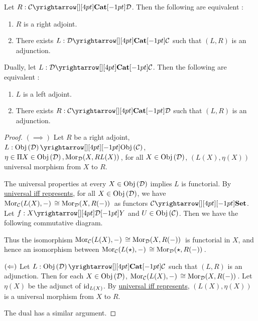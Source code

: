 \begin{prop}

  Let $R : \map{\CC}{\DD}{\CAT}{}$.
  Then the following are equivalent : 
  \begin{enumerate}
    \item $R$ is a right adjoint. 
    \item There exists $L : \map{\DD}{\CC}{\CAT}{}$ such that 
    $(L,R)$ is an adjunction. 
  \end{enumerate}

  Dually, let $L : \map{\DD}{\CC}{\CAT}{}$.
  Then the following are equivalent : 
  \begin{enumerate}
    \item $L$ is a left adjoint. 
    \item There exists $R : \map{\CC}{\DD}{\CAT}{}$ such that 
    $(L,R)$ is an adjunction. 
  \end{enumerate}
\end{prop}
\begin{proof}
  $(\implies)$
  Let $R$ be a right adjoint, $L : \map{\obj{\DD}}{\obj{\CC}}{}{}$, 
  $\eta \in \Pi X \in \mathrm{Obj}\left(\mathcal{D}\right), \mathrm{Mor}_{\mathcal{D}}(X, RL(X))\,$,
  for all $X \in \mathrm{Obj}\left(\mathcal{D}\right)$, $(L(X),\eta(X))$ universal morphism from 
  $X$ to $R$.

  The universal properties at every $X \in \mathrm{Obj}\left(\mathcal{D}\right)$ implies 
  $L$ is functorial.
  By \hyperlink{uni_iff_rep}{universal iff represents},
  for all $X \in \mathrm{Obj}\left(\mathcal{D}\right)$, 
  we have $\mathrm{Mor}_{\mathcal{C}}(L(X), -)\, \cong \mathrm{Mor}_{\mathcal{D}}(X, R(-))\,$
  as functors $\map{\CC}{\SET}{}{}$.
  Let $f : \map{X}{Y}{\DD}{}$ and $U \in \mathrm{Obj}\left(\mathcal{C}\right)$.
  Then we have the following commutative diagram. 
  \begin{figure}[H]
    \centering
  \end{figure}
  Thus the isomorphism $\mathrm{Mor}_{\mathcal{C}}(L(X), -)\, \cong \mathrm{Mor}_{\mathcal{D}}(X, R(-))\,$
  is functorial in $X$, 
  and hence an isomorphism between
  $\mathrm{Mor}_{\mathcal{C}}(L(\star), -)\, \cong \mathrm{Mor}_{\mathcal{D}}(\star, R(-))\,$.

  $(\Leftarrow)$ 
  Let $L : \map{\obj{\DD}}{\CC}{\CAT}{}$ such that 
  $(L,R)$ is an adjunction. 
  Then for each $X \in \mathrm{Obj}\left(\mathcal{D}\right)$, 
  $\mathrm{Mor}_{\mathcal{C}}(L(X), -)\, \cong \mathrm{Mor}_{\mathcal{D}}(X, R(-))\,$.
  Let $\eta(X)$ be the adjunct of $\mathrm{id}_{L(X)}$.
  By \hyperlink{uni_iff_rep}{universal iff represents},
  $(L(X),\eta(X))$ is a universal morphism from $X$ to $R$.

  The dual has a similar argument. 
\end{proof}


